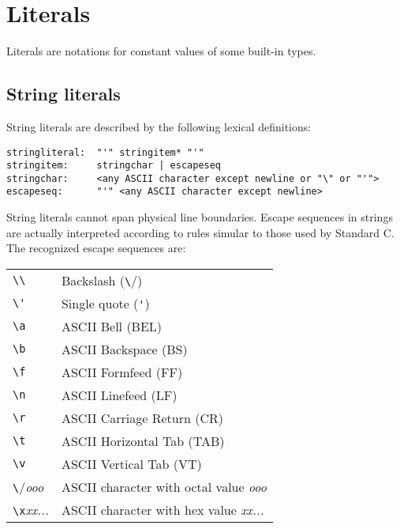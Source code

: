 \section{Literals} \label{literals}

Literals are notations for constant values of some built-in types.

\subsection{String literals}

String literals are described by the following lexical definitions:

\begin{verbatim}
stringliteral:  "'" stringitem* "'"
stringitem:     stringchar | escapeseq
stringchar:     <any ASCII character except newline or "\" or "'">
escapeseq:      "'" <any ASCII character except newline>
\end{verbatim}

String literals cannot span physical line boundaries.  Escape
sequences in strings are actually interpreted according to rules
simular to those used by Standard C.  The recognized escape sequences
are:

\begin{center}
\begin{tabular}{|l|l|}
\hline
\verb/\\/	& Backslash (\verb/\/) \\
\verb/\'/	& Single quote (\verb/'/) \\
\verb/\a/	& ASCII Bell (BEL) \\
\verb/\b/	& ASCII Backspace (BS) \\
\verb/\f/	& ASCII Formfeed (FF) \\
\verb/\n/	& ASCII Linefeed (LF) \\
\verb/\r/	& ASCII Carriage Return (CR) \\
\verb/\t/	& ASCII Horizontal Tab (TAB) \\
\verb/\v/	& ASCII Vertical Tab (VT) \\
\verb/\/{\em ooo}	& ASCII character with octal value {\em ooo} \\
\verb/\x/{\em xx...}	& ASCII character with hex value {\em xx...} \\
\hline
\end{tabular}
\end{center}

